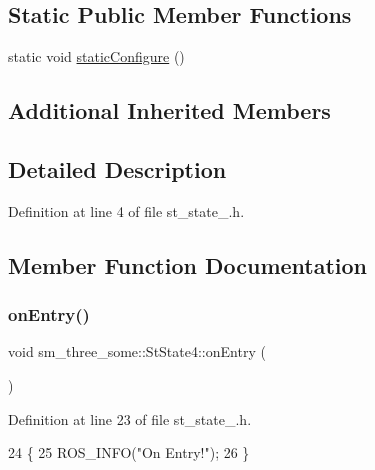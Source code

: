\subsection*{Static Public Member Functions}
\begin{DoxyCompactItemize}
\item 
static void \hyperlink{structsm__three__some_1_1StState4_ae244f918fa096ecbb501e25b9ca07512}{static\+Configure} ()
\end{DoxyCompactItemize}
\subsection*{Additional Inherited Members}


\subsection{Detailed Description}


Definition at line 4 of file st\+\_\+state\+\_.\+h.



\subsection{Member Function Documentation}
\mbox{\label{structsm__three__some_1_1StState4_a2140ab3ca693422132501cab77efca63}} 
\subsubsection{\texorpdfstring{on\+Entry()}{onEntry()}}
{\footnotesize\ttfamily void sm\+\_\+three\+\_\+some\+::\+St\+State4\+::on\+Entry (\begin{DoxyParamCaption}{ }\end{DoxyParamCaption})\hspace{0.3cm}{\ttfamily [inline]}}



Definition at line 23 of file st\+\_\+state\+\_.\+h.


\begin{DoxyCode}
24     \{
25         ROS\_INFO(\textcolor{stringliteral}{"On Entry!"});
26     \}
\end{DoxyCode}
\mbox{\label{structsm__three__some_1_1StState4_a3479e642b294941bb91c09d211df84e7}} 
